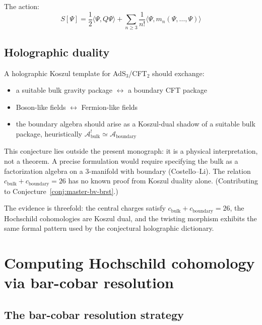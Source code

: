 The action:
\[
S[\Psi] = \frac{1}{2}\langle \Psi, Q\Psi \rangle + \sum_{n \geq 3} \frac{1}{n!}\langle \Psi, m_n(\Psi,\ldots,\Psi)\rangle
\]

\subsection{Holographic duality}

\begin{conjecture}
\label{conj:holographic-koszul-deformation}
A holographic Koszul template for AdS$_3$/CFT$_2$ should exchange:
\begin{itemize}
\item a suitable bulk gravity package $\leftrightarrow$ a boundary CFT package
\item Boson-like fields $\leftrightarrow$ Fermion-like fields
\item the boundary algebra should arise as a Koszul-dual shadow of a
  suitable bulk package, heuristically
  $\mathcal{A}_{\text{bulk}}^! \simeq \mathcal{A}_{\text{boundary}}$
\end{itemize}
\end{conjecture}

\begin{remark}[Scope]
This conjecture lies outside the present monograph: it is a physical
interpretation, not a theorem.  A precise formulation would require
specifying the bulk as a factorization algebra on a $3$-manifold with
boundary (Costello--Li).  The relation $c_{\text{bulk}} +
c_{\text{boundary}} = 26$ has no known proof from Koszul duality alone.
(Contributing to Conjecture~\ref{conj:master-bv-brst}.)
\end{remark}

The evidence is threefold: the central charges satisfy
$c_{\mathrm{bulk}} + c_{\mathrm{boundary}} = 26$, the Hochschild
cohomologies are Koszul dual, and the twisting morphism exhibits
the same formal pattern used by the conjectural holographic dictionary.

\section{Computing Hochschild cohomology via bar-cobar resolution}
\label{sec:hochschild-via-bar-cobar-complete}

\subsection{The bar-cobar resolution strategy}


